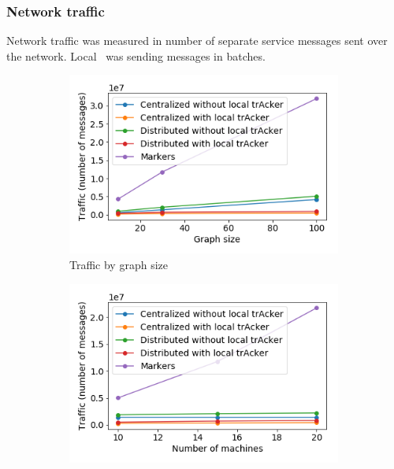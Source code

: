 \subsubsection{Network traffic}

Network traffic was measured in number of separate service messages sent over the network. Local \tracker\ was sending messages in batches.

\begin{figure}[t!]
    \begin{subfigure}[b]{0.32\textwidth}
            \includegraphics[width=0.99\textwidth]{pics/traffic_by_graph_size.png}
            \caption{Traffic by graph size}
    \end{subfigure}
    \hspace{5mm}
    \begin{subfigure}[b]{0.32\textwidth}
            \includegraphics[width=0.99\textwidth]{pics/traffic_by_number_of_machines.png}

\end{subfigure}
\end{figure}
